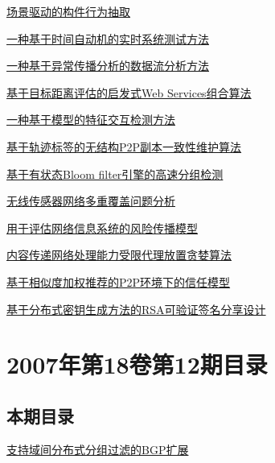 \documentclass[a4paper]{article}
\begin{document}
\href{http://www.jos.org.cn/ch/reader/download_pdf.aspx?file_no=20070106&year_id=2007&quarter_id=1&falg=1}{场景驱动的构件行为抽取}

\href{http://www.jos.org.cn/ch/reader/download_pdf.aspx?file_no=20070107&year_id=2007&quarter_id=1&falg=1}{一种基于时间自动机的实时系统测试方法}

\href{http://www.jos.org.cn/ch/reader/download_pdf.aspx?file_no=20070108&year_id=2007&quarter_id=1&falg=1}{一种基于异常传播分析的数据流分析方法}

\href{http://www.jos.org.cn/ch/reader/download_pdf.aspx?file_no=20070109&year_id=2007&quarter_id=1&falg=1}{基于目标距离评估的启发式Web Services组合算法}

\href{http://www.jos.org.cn/ch/reader/download_pdf.aspx?file_no=20070110&year_id=2007&quarter_id=1&falg=1}{一种基于模型的特征交互检测方法}

\href{http://www.jos.org.cn/ch/reader/download_pdf.aspx?file_no=20070111&year_id=2007&quarter_id=1&falg=1}{基于轨迹标签的无结构P2P副本一致性维护算法}

\href{http://www.jos.org.cn/ch/reader/download_pdf.aspx?file_no=20070112&year_id=2007&quarter_id=1&falg=1}{基于有状态Bloom filter引擎的高速分组检测}

\href{http://www.jos.org.cn/ch/reader/download_pdf.aspx?file_no=20070113&year_id=2007&quarter_id=1&falg=1}{无线传感器网络多重覆盖问题分析}

\href{http://www.jos.org.cn/ch/reader/download_pdf.aspx?file_no=20070114&year_id=2007&quarter_id=1&falg=1}{用于评估网络信息系统的风险传播模型}

\href{http://www.jos.org.cn/ch/reader/download_pdf.aspx?file_no=20070115&year_id=2007&quarter_id=1&falg=1}{内容传递网络处理能力受限代理放置贪婪算法}

\href{http://www.jos.org.cn/ch/reader/download_pdf.aspx?file_no=20070116&year_id=2007&quarter_id=1&falg=1}{基于相似度加权推荐的P2P环境下的信任模型}

\href{http://www.jos.org.cn/ch/reader/download_pdf.aspx?file_no=20070117&year_id=2007&quarter_id=1&falg=1}{基于分布式密钥生成方法的RSA可验证签名分享设计}


\section{\textbf{2007年第18卷第12期目录}}
\subsection{本期目录}
\href{http://www.jos.org.cn/ch/reader/download_pdf.aspx?file_no=20071208&year_id=2007&quarter_id=12&falg=1}{支持域间分布式分组过滤的BGP扩展}
\end{document}
